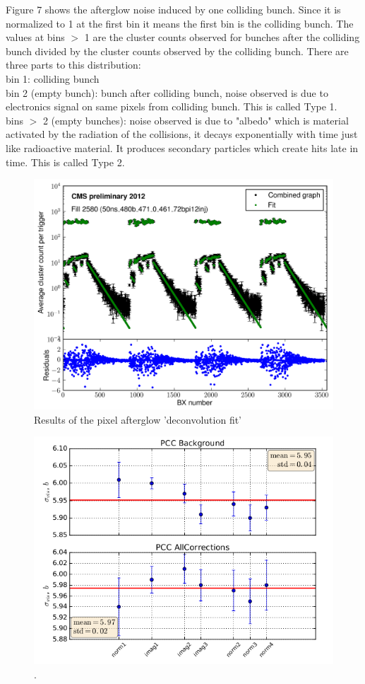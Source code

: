 Figure 7 shows the afterglow noise induced by one colliding bunch. Since it is normalized to 1 at the first bin it means the first bin is the colliding bunch. The values at bins $>$ 1 are the cluster counts observed for bunches after the colliding bunch divided by the cluster counts observed by the colliding bunch. There are three parts to this distribution: \\

bin 1: colliding bunch \\

bin 2 (empty bunch): bunch after colliding bunch, noise observed is due to electronics signal on same pixels from colliding bunch. This is called Type 1. \\

bins $>$ 2 (empty bunches): noise observed is due to "albedo" which is material activated by the radiation of the collisions, it decays exponentially with time just like radioactive material. It produces secondary particles which create hits late in time. This is called Type 2.

\begin{figure}[H]
  \centering
  \includegraphics[width=0.5\columnwidth]{./afterglow.png}
  \caption{Results of the pixel afterglow 'deconvolution fit'}
  \label{fig:LHC}
\end{figure}


\begin{figure}[H]
  \centering
  \includegraphics[width=0.6\columnwidth]{./PCC_background.png}
  \caption{ \onehalfspacing \cite{}.}
  \label{fig:CMS}
\end{figure}
